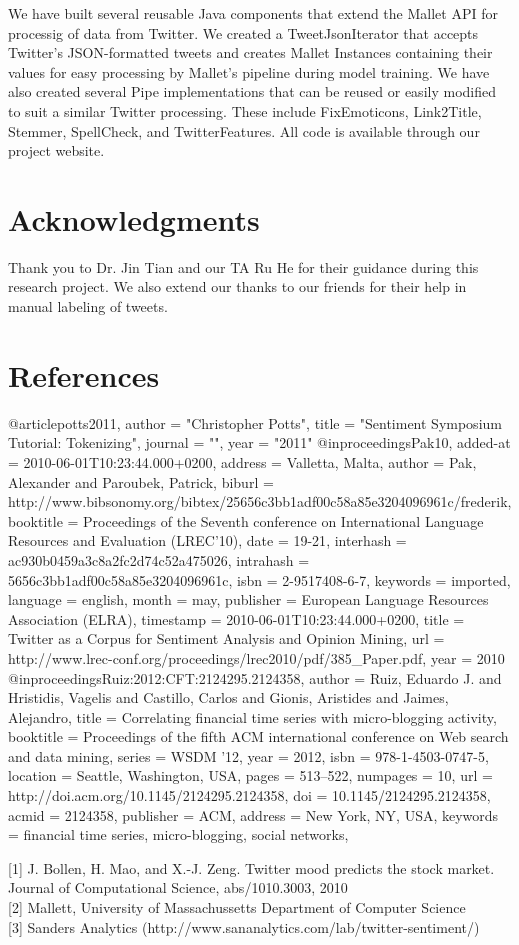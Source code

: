 \documentclass[letterpaper]{article}
\begin{document}
We have built several reusable Java components that extend the Mallet API for processig of data from Twitter. We created a TweetJsonIterator that accepts Twitter's JSON-formatted tweets and creates Mallet Instances containing their values for easy processing by Mallet's pipeline during model training. We have also created several Pipe implementations that can be reused or easily modified to suit a similar Twitter processing. These include FixEmoticons, Link2Title, Stemmer, SpellCheck, and TwitterFeatures. All code is available through our project website.

\section{ Acknowledgments}
Thank you to Dr. Jin Tian and our TA Ru He for their guidance during this research project. We also extend our thanks to our friends for their help in manual labeling of tweets.

\section{References}
\begin{thebibliography}{99}
@article{potts2011,
    author    = "Christopher Potts",
    title     = "Sentiment Symposium Tutorial: Tokenizing",
    journal   = "",
    year      = "2011"
}
@inproceedings{Pak10,
  added-at = {2010-06-01T10:23:44.000+0200},
  address = {Valletta, Malta},
  author = {Pak, Alexander and Paroubek, Patrick},
  biburl = {http://www.bibsonomy.org/bibtex/25656c3bb1adf00c58a85e3204096961c/frederik},
  booktitle = {Proceedings of the Seventh conference on International Language Resources and Evaluation (LREC'10)},
  date = {19-21},
  interhash = {ac930b0459a3c8a2fc2d74c52a475026},
  intrahash = {5656c3bb1adf00c58a85e3204096961c},
  isbn = {2-9517408-6-7},
  keywords = {imported},
  language = {english},
  month = may,
  publisher = {European Language Resources Association (ELRA)},
  timestamp = {2010-06-01T10:23:44.000+0200},
  title = {Twitter as a Corpus for Sentiment Analysis and Opinion Mining},
  url = {http://www.lrec-conf.org/proceedings/lrec2010/pdf/385_Paper.pdf},
  year = 2010
}
@inproceedings{Ruiz:2012:CFT:2124295.2124358,
 author = {Ruiz, Eduardo J. and Hristidis, Vagelis and Castillo, Carlos and Gionis, Aristides and Jaimes, Alejandro},
 title = {Correlating financial time series with micro-blogging activity},
 booktitle = {Proceedings of the fifth ACM international conference on Web search and data mining},
 series = {WSDM '12},
 year = {2012},
 isbn = {978-1-4503-0747-5},
 location = {Seattle, Washington, USA},
 pages = {513--522},
 numpages = {10},
 url = {http://doi.acm.org/10.1145/2124295.2124358},
 doi = {10.1145/2124295.2124358},
 acmid = {2124358},
 publisher = {ACM},
 address = {New York, NY, USA},
 keywords = {financial time series, micro-blogging, social networks},
} 
\end{thebibliography}

[1] J. Bollen, H. Mao, and X.-J. Zeng. Twitter mood predicts the
stock market. Journal of Computational Science,
abs/1010.3003, 2010\\

[2] Mallett, University of Massachussetts Department of Computer Science\\

[3] Sanders Analytics (http://www.sananalytics.com/lab/twitter-sentiment/)
\end{document}
